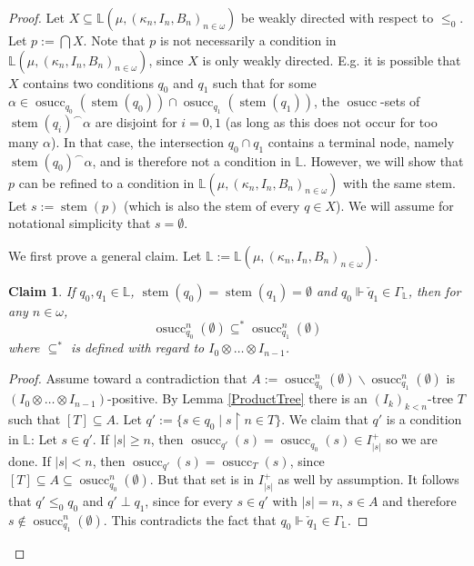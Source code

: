 \documentclass[a4paper]{amsart}
\theoremstyle{definition}
\theoremstyle{remark}
\theoremstyle{plain}
\newtheorem{myclaim}{Claim}
\numberwithin{mydef}{section}
\DeclareMathOperator{\stem}{stem}
\DeclareMathOperator{\osucc}{osucc}
\newcommand{\dL}{\mathbb{L}}
\newcommand{\uhr}{\upharpoonright}
\begin{document}
	\begin{proof}
		Let $X\subseteq\dL(\mu,(\kappa_n,I_n,B_n)_{n\in\omega})$ be weakly directed with respect to $\leq_0$. Let $p:=\bigcap X$. Note that $p$ is not necessarily a condition in $\dL(\mu,(\kappa_n,I_n,B_n)_{n\in\omega})$, since $X$ is only weakly directed. E.g. it is possible that $X$ contains two conditions $q_0$ and $q_1$ such that for some $\alpha\in\osucc_{q_0}(\stem(q_0))\cap\osucc_{q_1}(\stem(q_1))$, the $\osucc$-sets of $\stem(q_i)^{\frown}\alpha$ are disjoint for $i=0,1$ (as long as this does not occur for too many $\alpha$). In that case, the intersection $q_0\cap q_1$ contains a terminal node, namely $\stem(q_0)^{\frown}\alpha$, and is therefore not a condition in $\dL$. However, we will show that $p$ can be refined to a condition in $\dL(\mu,(\kappa_n,I_n,B_n)_{n\in\omega})$ with the same stem. Let $s:=\stem(p)$ (which is also the stem of every $q\in X$). We will assume for notational simplicity that $s=\emptyset$.
		
		\setcounter{myclaim}{0}
		
		We first prove a general claim. Let $\dL:=\dL(\mu,(\kappa_n,I_n,B_n)_{n\in\omega})$.
		
		\begin{myclaim}\label{LClosureClaim1}
			If $q_0,q_1\in\dL$, $\stem(q_0)=\stem(q_1)=\emptyset$ and $q_0\Vdash\check{q}_1\in\Gamma_{\dL}$, then for any $n\in\omega$,
			$$\osucc_{q_0}^n(\emptyset)\subseteq^*\osucc_{q_1}^n(\emptyset)$$
			where $\subseteq^*$ is defined with regard to $I_0\otimes\dots\otimes I_{n-1}$.
		\end{myclaim}
		
		\begin{proof}
			Assume toward a contradiction that $A:=\osucc_{q_0}^n(\emptyset)\smallsetminus\osucc_{q_1}^n(\emptyset)$ is $ (I_0\otimes\dots\otimes I_{n-1})$-positive. By Lemma \ref{ProductTree} there is an $(I_k)_{k<n}$-tree $T$ such that $[T]\subseteq A$. Let $q':=\{s\in q_0\;|\;s\uhr n\in T\}$. We claim that $q'$ is a condition in $\dL$: Let $s\in q'$. If $|s|\geq n$, then $\osucc_{q'}(s)=\osucc_{q_0}(s)\in I_{|s|}^+$ so we are done. If $|s|<n$, then $\osucc_{q'}(s)=\osucc_T(s)$, since $[T]\subseteq A\subseteq\osucc_{q_0}^n(\emptyset)$. But that set is in $I_{|s|}^+$ as well by assumption. It follows that $q'\leq_0q_0$ and $q'\perp q_1$, since for every $s\in q'$ with $|s|=n$, $s\in A$ and therefore $s\notin\osucc_{q_1}^n(\emptyset)$. This  contradicts the fact that $q_0\Vdash\check{q}_1\in\Gamma_{\dL}$.
		\end{proof}
		

\end{proof}
\end{document}
